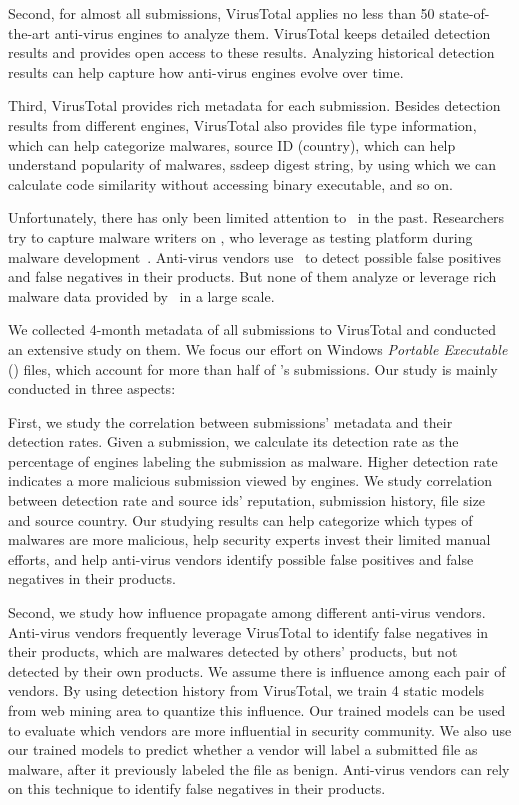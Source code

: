 Second, for almost all submissions, 
VirusTotal applies no less than 50 state-of-the-art anti-virus engines to analyze them. 
VirusTotal keeps detailed detection results and provides open access to these results. 
Analyzing historical detection results can help capture how anti-virus engines evolve over time. 

Third, VirusTotal provides rich metadata for each submission. 
Besides detection results from different engines, 
VirusTotal also provides file type information, which can help categorize malwares, 
source ID (country), which can help understand popularity of malwares, 
ssdeep digest string, by using which we can calculate code similarity without accessing binary executable, and so on. 

Unfortunately, there has only been limited attention to \vt\ in the past. 
Researchers try to capture malware writers on \vt{}, who leverage \vt{} as testing platform during malware development~\cite{huangvt2016bigdata, neeles}. 
Anti-virus vendors use \vt\ to detect possible false positives and false negatives in their products. 
But none of them analyze or leverage rich malware data provided by \vt\ in a large scale. 

We collected 4-month metadata of all submissions to VirusTotal 
and conducted an extensive study on them.
We focus our effort on Windows \textit{Portable Executable} ({\em \pe}) files, 
which account for more than half of \vt{}’s submissions.
Our study is mainly conducted in three aspects: 

First, we study the correlation between submissions’ metadata and their detection rates. 
Given a submission, 
we calculate its detection rate as the percentage of engines 
labeling the submission as malware. 
Higher detection rate indicates a more malicious submission viewed by engines.  
We study correlation between detection rate 
and source ids’ reputation, submission history, file size and source country. 
Our studying results can help categorize which types of malwares are more malicious, 
help security experts invest their limited manual efforts, 
and help anti-virus vendors identify possible false positives and false negatives in their products.   


Second, we study how influence propagate among different anti-virus vendors. 
Anti-virus vendors frequently leverage VirusTotal to identify false negatives in their products, 
which are malwares detected by others’ products, 
but not detected by their own products. 
We assume there is influence among each pair of vendors. 
By using detection history from VirusTotal, 
we train 4 static models from web mining area to quantize this influence. 
Our trained models can be used to evaluate which vendors are more influential in security community. 
We also use our trained models to predict whether a vendor will label a submitted file as malware, 
after it previously labeled the file as benign. 
Anti-virus vendors can rely on this technique to identify false negatives in their products. 

